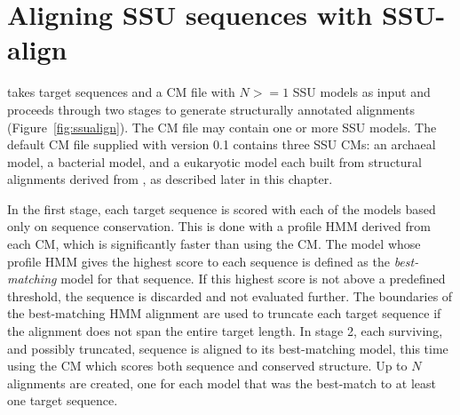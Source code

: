\section{Aligning SSU sequences with SSU-align}

 takes target sequences and a CM file with $N >=
1$ SSU models as input and proceeds through two stages to generate
structurally annotated alignments (Figure~\ref{fig:ssualign}).  The CM
file
may contain one or more SSU models. The default CM file supplied with
 version 0.1 contains three SSU CMs: an archaeal model,
a bacterial model, and a eukaryotic model each
built from structural alignments derived from 
\cite{CannoneGutell02}, as described later in this chapter. 

In the first stage, each target sequence is scored with each of the
models based only on sequence conservation. This is done with a
profile HMM derived from each CM, which is significantly faster than
using the CM\@.  The model whose profile HMM gives the highest score to
each sequence is defined as the \emph{best-matching} model for that
sequence. If this highest score is not above a predefined threshold,
the sequence is discarded and not evaluated further. The boundaries of
the best-matching HMM alignment are used to truncate each target
sequence if the alignment does not span the entire target length.  In
stage 2, each surviving, and possibly truncated, sequence is aligned
to its best-matching model, this time using the CM which scores
both sequence and conserved structure. Up to $N$ alignments are
created, one for each model that was the best-match to at least one
target sequence.

